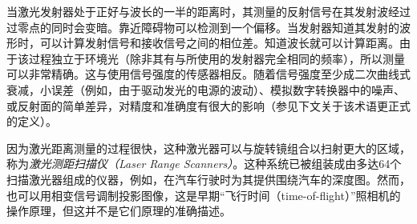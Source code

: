 当激光发射器处于正好与波长的一半的距离时，其测量的反射信号在其发射波经过过零点的同时会变暗。靠近障碍物可以检测到一个偏移。当发射器知道其发射的波形时，可以计算发射信号和接收信号之间的相位差。知道波长就可以计算距离。由于该过程独立于环境光（除非其有与所使用的发射器完全相同的频率），所以测量可以非常精确。这与使用信号强度的传感器相反。随着信号强度至少成二次曲线式衰减，小误差（例如，由于驱动发光的电源的波动）、模拟数字转换器中的噪声、或反射面的简单差异，对精度和准确度有很大的影响（参见下文关于该术语更正式的定义）。


因为激光距离测量的过程很快，这种激光器可以与旋转镜组合以扫射更大的区域，称为\emph{激光测距扫描仪（Laser Range Scanners）}。这种系统已被组装成由多达64个扫描激光器组成的仪器，例如，在汽车行驶时为其提供围绕汽车的深度图。然而，也可以用相变信号调制投影图像，这是早期“飞行时间（time-of-flight）”照相机的操作原理，但这并不是它们原理的准确描述。




